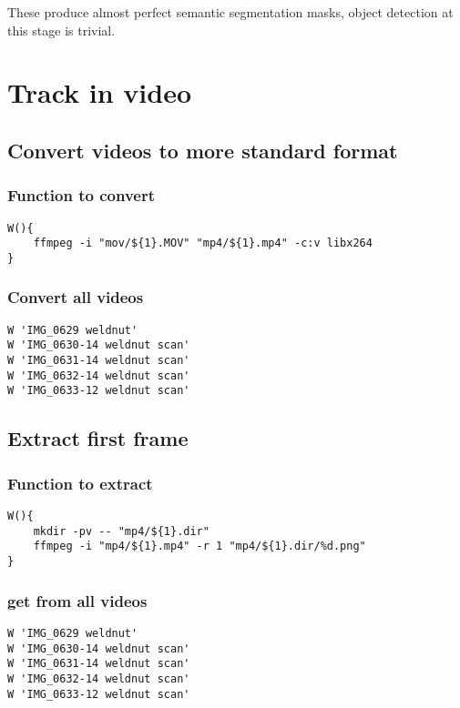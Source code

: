 \documentclass[11pt]{article}
\begin{document}
These produce almost perfect semantic segmentation masks, object detection at this stage is trivial.
\section{Track in video}
\label{sec:org65b70b0}

\subsection{Convert videos to more standard format}
\label{sec:org88fea72}

\subsubsection{Function to convert}
\label{sec:orga59d24c}
\begin{verbatim}
W(){
    ffmpeg -i "mov/${1}.MOV" "mp4/${1}.mp4" -c:v libx264
}
\end{verbatim}
\subsubsection{Convert all videos}
\label{sec:orgcc811e0}
\begin{verbatim}
W 'IMG_0629 weldnut'
W 'IMG_0630-14 weldnut scan'
W 'IMG_0631-14 weldnut scan'
W 'IMG_0632-14 weldnut scan'
W 'IMG_0633-12 weldnut scan'
\end{verbatim}
\subsection{Extract first frame}
\label{sec:orgc8f4c55}

\subsubsection{Function to extract}
\label{sec:org07295af}
\begin{verbatim}
W(){
    mkdir -pv -- "mp4/${1}.dir"
    ffmpeg -i "mp4/${1}.mp4" -r 1 "mp4/${1}.dir/%d.png" 
}
\end{verbatim}
\subsubsection{get from all videos}
\label{sec:org36562be}
\begin{verbatim}
W 'IMG_0629 weldnut'
W 'IMG_0630-14 weldnut scan'
W 'IMG_0631-14 weldnut scan'
W 'IMG_0632-14 weldnut scan'
W 'IMG_0633-12 weldnut scan'
\end{verbatim}
\end{document}
